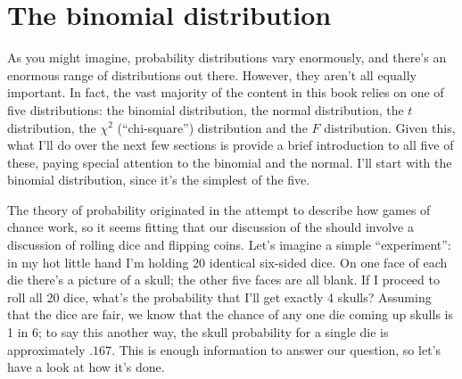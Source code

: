 \section{The binomial distribution\label{sec:binomial}}

As you might imagine, probability distributions vary enormously, and there's an enormous range of distributions out there. However, they aren't all equally important. In fact, the vast majority of the content in this book relies on one of five distributions: the binomial distribution, the normal distribution, the $t$ distribution, the $\chi^2$ (``chi-square'') distribution and the $F$ distribution. Given this, what I'll do over the next few sections is provide a brief introduction to all five of these, paying special attention to the binomial and the normal. I'll start with the binomial distribution, since it's the simplest of the five.


The theory of probability originated in the attempt to describe how games of chance work, so it seems fitting that our discussion of the  should involve a discussion of rolling dice and flipping coins. Let's imagine a simple ``experiment'': in my hot little hand I'm holding 20 identical six-sided dice. On one face of each die there's a picture of a skull; the other five faces are all blank. If I proceed to roll all 20 dice, what's the probability that I'll get exactly 4 skulls? Assuming that the dice are fair, we know that the chance of any one die coming up skulls is 1 in 6; to say this another way, the skull probability for a single die is approximately $.167$. This is enough information to answer our question, so let's have a look at how it's done. 


